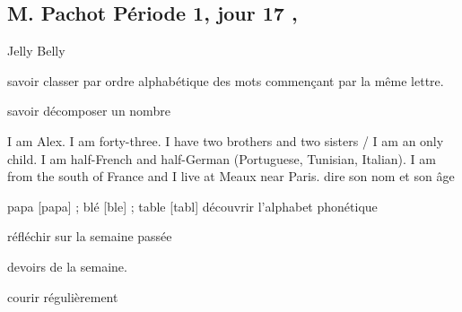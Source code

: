 \documentclass{article}
\begin{document}
\reversemarginpar
\setlength{\parskip}{3.3ex}
	
\subsection*{M. Pachot \hfill Période 1, jour 17 \hfill {} \sep}

\nte Jelly Belly


\dis\cfr{}
\obj savoir classer par ordre alphabétique des mots commençant par la même lettre.

\dis\cma{}
\obj savoir décomposer un nombre


\Dis\cen{} I am Alex. I am forty-three. I have two brothers and two sisters / I am an only child. I am half-French and half-German (Portuguese, Tunisian, Italian). I am from the south of France and I live at Meaux near Paris.
\obj dire son nom et son âge

\dis\cfr{}

\Dis\cfr{}
\Ard papa [papa] ; blé [ble] ; table [tabl]
\obj découvrir l’alphabet phonétique



\Dis\chg{}

\Dis\chg{}
\obj réfléchir sur la semaine passée


\dev devoirs de la semaine.

\Dis\csp{}
\obj courir régulièrement

\end{document}
